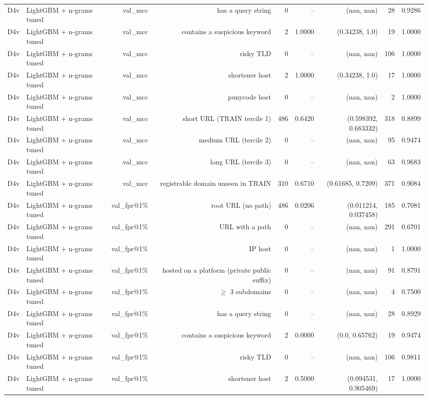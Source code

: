 \begin{table}[t]
\begin{tabular}{llrrrrrrr}
D4v & LightGBM + n-grams tuned & val\_mcc & has a query string & 0 & -- & (nan, nan) & 28 & 0.9286 \\
D4v & LightGBM + n-grams tuned & val\_mcc & contains a suspicious keyword & 2 & 1.0000 & (0.34238, 1.0) & 19 & 1.0000 \\
D4v & LightGBM + n-grams tuned & val\_mcc & risky TLD & 0 & -- & (nan, nan) & 106 & 1.0000 \\
D4v & LightGBM + n-grams tuned & val\_mcc & shortener host & 2 & 1.0000 & (0.34238, 1.0) & 17 & 1.0000 \\
D4v & LightGBM + n-grams tuned & val\_mcc & punycode host & 0 & -- & (nan, nan) & 2 & 1.0000 \\
D4v & LightGBM + n-grams tuned & val\_mcc & short URL (TRAIN tercile 1) & 486 & 0.6420 & (0.598392, 0.683332) & 318 & 0.8899 \\
D4v & LightGBM + n-grams tuned & val\_mcc & medium URL (tercile 2) & 0 & -- & (nan, nan) & 95 & 0.9474 \\
D4v & LightGBM + n-grams tuned & val\_mcc & long URL (tercile 3) & 0 & -- & (nan, nan) & 63 & 0.9683 \\
D4v & LightGBM + n-grams tuned & val\_mcc & registrable domain unseen in TRAIN & 310 & 0.6710 & (0.61685, 0.7209) & 371 & 0.9084 \\
D4v & LightGBM + n-grams tuned & val\_fpr@1\% & root URL (no path) & 486 & 0.0206 & (0.011214, 0.037458) & 185 & 0.7081 \\
D4v & LightGBM + n-grams tuned & val\_fpr@1\% & URL with a path & 0 & -- & (nan, nan) & 291 & 0.6701 \\
D4v & LightGBM + n-grams tuned & val\_fpr@1\% & IP host & 0 & -- & (nan, nan) & 1 & 1.0000 \\
D4v & LightGBM + n-grams tuned & val\_fpr@1\% & hosted on a platform (private public suffix) & 0 & -- & (nan, nan) & 91 & 0.8791 \\
D4v & LightGBM + n-grams tuned & val\_fpr@1\% & $\geq$ 3 subdomains & 0 & -- & (nan, nan) & 4 & 0.7500 \\
D4v & LightGBM + n-grams tuned & val\_fpr@1\% & has a query string & 0 & -- & (nan, nan) & 28 & 0.8929 \\
D4v & LightGBM + n-grams tuned & val\_fpr@1\% & contains a suspicious keyword & 2 & 0.0000 & (0.0, 0.65762) & 19 & 0.9474 \\
D4v & LightGBM + n-grams tuned & val\_fpr@1\% & risky TLD & 0 & -- & (nan, nan) & 106 & 0.9811 \\
D4v & LightGBM + n-grams tuned & val\_fpr@1\% & shortener host & 2 & 0.5000 & (0.094531, 0.905469) & 17 & 1.0000 \\

\end{tabular}
\end{table}
